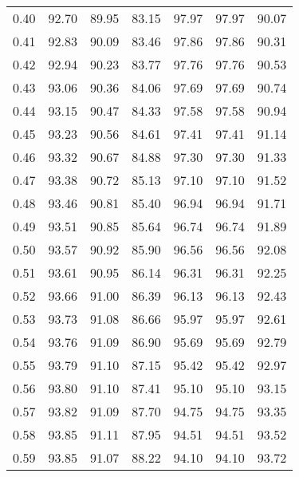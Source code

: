 \begin{tabular}{|c|c|c|c|c|c|c|}
      0.40 &     92.70 &     89.95 &      83.15 &   97.97 &      97.97 &         90.07 \\
      0.41 &     92.83 &     90.09 &      83.46 &   97.86 &      97.86 &         90.31 \\
      0.42 &     92.94 &     90.23 &      83.77 &   97.76 &      97.76 &         90.53 \\
      0.43 &     93.06 &     90.36 &      84.06 &   97.69 &      97.69 &         90.74 \\
      0.44 &     93.15 &     90.47 &      84.33 &   97.58 &      97.58 &         90.94 \\
      0.45 &     93.23 &     90.56 &      84.61 &   97.41 &      97.41 &         91.14 \\
      0.46 &     93.32 &     90.67 &      84.88 &   97.30 &      97.30 &         91.33 \\
      0.47 &     93.38 &     90.72 &      85.13 &   97.10 &      97.10 &         91.52 \\
      0.48 &     93.46 &     90.81 &      85.40 &   96.94 &      96.94 &         91.71 \\
      0.49 &     93.51 &     90.85 &      85.64 &   96.74 &      96.74 &         91.89 \\
      0.50 &     93.57 &     90.92 &      85.90 &   96.56 &      96.56 &         92.08 \\
      0.51 &     93.61 &     90.95 &      86.14 &   96.31 &      96.31 &         92.25 \\
      0.52 &     93.66 &     91.00 &      86.39 &   96.13 &      96.13 &         92.43 \\
      0.53 &     93.73 &     91.08 &      86.66 &   95.97 &      95.97 &         92.61 \\
      0.54 &     93.76 &     91.09 &      86.90 &   95.69 &      95.69 &         92.79 \\
      0.55 &     93.79 &     91.10 &      87.15 &   95.42 &      95.42 &         92.97 \\
      0.56 &     93.80 &     91.10 &      87.41 &   95.10 &      95.10 &         93.15 \\
      0.57 &     93.82 &     91.09 &      87.70 &   94.75 &      94.75 &         93.35 \\
      0.58 &     93.85 &     91.11 &      87.95 &   94.51 &      94.51 &         93.52 \\
      0.59 &     93.85 &     91.07 &      88.22 &   94.10 &      94.10 &         93.72 \\

\end{tabular}
